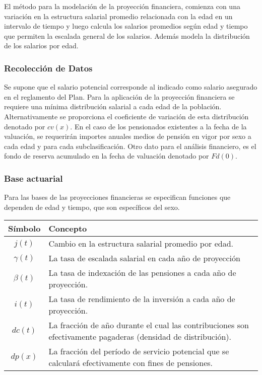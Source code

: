 \documentclass[12pt,letterpaper,titlepage]{article}
\begin{document}
{El método para la modelación de la proyección financiera, comienza con una variación en la estructura salarial promedio relacionada con la edad en un intervalo de tiempo y luego calcula los salarios promedios según edad y tiempo que permiten la escalada general de los salarios. Además modela la distribución de los salarios por edad.


\subsubsection{Recolección de Datos}

Se supone que el salario potencial corresponde al indicado como salario asegurado en el reglamento del Plan. Para la aplicación de la proyección financiera se requiere una mínima distribución salarial a cada edad de la población. Alternativamente se proporciona el coeficiente de variación de esta distribución denotado por $cv(x)$. En el caso de los pensionados existentes a la fecha de la valuación, se requerirán importes anuales medios de pensión en vigor por sexo a cada edad y para cada subclasificación. Otro dato para el análisis financiero, es el fondo de reserva acumulado en la fecha de valuación denotado por $Fd(0)$.


\subsubsection{Base actuarial}

Para las bases de las proyecciones financieras se especifican funciones que dependen de edad y tiempo, que son específicos del sexo.

\begin{tabular}{|c||p{11cm}|}
	\hline 
	Símbolo & Concepto \\ 
	\hline
 	\hline
	$j(t)$ & Cambio en la estructura salarial promedio por edad. \\ 
	\hline 
	$\gamma(t)$ & La tasa de escalada salarial en cada año de proyección \\ 
	\hline 
	$\beta(t)$ & La tasa de indexación de las pensiones a cada año de proyección. \\ 
	\hline 
	$i(t)$ & La tasa de rendimiento de la inversión a cada año de proyección. \\ 
	\hline 
	$dc(t)$ & La fracción de año durante el cual las contribuciones son efectivamente pagaderas (densidad de distribución). \\ 
	\hline 
	$dp(x)$ & La fracción del período de servicio potencial que se calculará efectivamente con fines de pensiones.\\
	\hline 
\end{tabular} 

}
\end{document}
